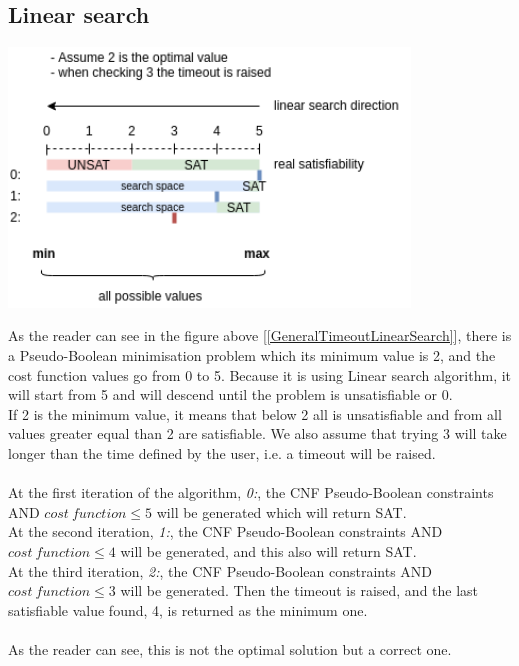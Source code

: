 \subsection{Linear search}
\begin{center}
	\includegraphics[width=0.8\textwidth]{Figures/GeneralTimeoutLinearSearch.png}
	\label{GeneralTimeoutLinearSearch}
\end{center}
As the reader can see in the figure above [\ref{GeneralTimeoutLinearSearch}], there is a Pseudo-Boolean minimisation problem which its minimum value is 2, and the cost function values go from 0 to 5. Because it is using Linear search algorithm, it will start from 5 and will descend until the problem is unsatisfiable or 0. \\
If 2 is the minimum value, it means that below 2 all is unsatisfiable and from all values greater equal than 2 are satisfiable.  We also assume that trying 3 will take longer than the time defined by the user, i.e. a timeout will be raised.\\\\
At the first iteration of the algorithm, \emph{0:}, the CNF Pseudo-Boolean constraints AND $cost \ function \leq 5$ will be generated which will return SAT.\\
At the second iteration, \emph{1:}, the CNF Pseudo-Boolean constraints AND $cost \ function \leq 4$ will be generated, and this also will return SAT.\\
At the third iteration, \emph{2:}, the CNF Pseudo-Boolean constraints AND $cost \ function \leq 3$ will be generated. Then the timeout is raised, and the last satisfiable value found, 4, is returned as the minimum one.\\\\
As the reader can see, this is not the optimal solution but a correct one. 

